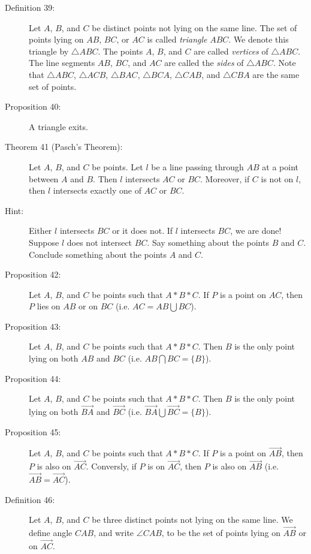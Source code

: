 \documentclass{article}
\newcommand{\ray}[1]{\stackrel{\longrightarrow}{#1} }
\begin{document}
\begin{description}
\item[Definition 39:] Let $A$, $B$, and $C$ be distinct points not lying on the same line. The set of points lying on $AB$, $BC$, or $AC$ is called \emph{triangle} $ABC$. We denote this triangle by $\triangle ABC$. The points $A$, $B$, and $C$ are called \emph{vertices} of $\triangle ABC$. The line segments $AB$, $BC$, and $AC$ are called the \emph{sides} of $\triangle ABC$. Note that $\triangle ABC$, $\triangle ACB$, $\triangle BAC$, $\triangle BCA$, $\triangle CAB$, and $\triangle CBA$ are the same set of points.

\item[Proposition 40:] A triangle exits.

\item[Theorem 41 (Pasch's Theorem):] Let $A$, $B$, and $C$ be points. Let $l$ be a line passing through $AB$ at a point between $A$ and $B$. Then $l$ intersects $AC$ or $BC$.  Moreover, if $C$ is not on $l$, then $l$ intersects exactly one of $AC$ or $BC$.

\item[Hint:] Either $l$ intersects $BC$ or it does not. If $l$ intersects $BC$, we are done! Suppose $l$ does not intersect $BC$. Say something about the points $B$ and $C$. Conclude something about the points $A$ and $C$.

\item[Proposition 42:] Let $A$, $B$, and $C$ be points such that $A*B*C$. If $P$ is a point on $AC$, then $P$ lies on $AB$ or on $BC$ (i.e. $AC = AB \bigcup BC$).

\item[Proposition 43:] Let $A$, $B$, and $C$ be points such that $A*B*C$. Then $B$ is the only point lying on both $AB$ and $BC$ (i.e. $AB \bigcap BC = \{ B \}$).

\item[Proposition 44:] Let $A$, $B$, and $C$ be points such that $A*B*C$. Then $B$ is the only point lying on both $\ray{BA}$ and $\ray{BC}$ (i.e. $\ray{BA} \bigcup \ray{BC} = \{ B \}$).

\item[Proposition 45:] Let $A$, $B$, and $C$ be points such that $A*B*C$. If $P$ is a point on $\ray{AB}$, then $P$ is also on $\ray{AC}$. Conversly, if $P$ is on $\ray{AC}$, then $P$ is also on $\ray{AB}$ (i.e. $\ray{AB} = \ray{AC}$).

\item[Definition 46:] Let $A$, $B$, and $C$ be three distinct points not lying on the same line. We define angle $CAB$, and write $\angle CAB$, to be the set of points lying on $\ray{AB}$ or on $\ray{AC}$.


\end{description}
\end{document}

